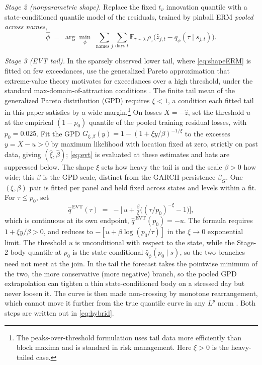 \documentclass[11pt]{article}
\theoremstyle{remark}
\begin{document}
\emph{Stage 2 (nonparametric shape).} Replace the fixed $t_\nu$
innovation quantile with a state-conditioned quantile model of the
residuals, trained by pinball ERM \emph{pooled across names},
\begin{equation}
\widehat{\phi} \;=\; \arg\min_{\phi}\;
\sum_{\text{names } j}\sum_{\text{days } t}
\mathbb{E}_{\tau\sim\lambda}\,
\rho_\tau\!\big(\widehat{z}_{j,t} - q_\phi(\tau \mid s_{j,t})\big).
\label{eq:shapeERM}
\end{equation}

\emph{Stage 3 (EVT tail).} In the sparsely observed lower tail, where
\eqref{eq:shapeERM} is fitted on few exceedances, use the generalized Pareto
approximation that extreme-value theory motivates for exceedances over
a high threshold, under the standard max-domain-of-attraction
conditions \citep{balkema1974, pickands1975, mcneilfrey2000}. The finite tail mean of the generalized Pareto distribution (GPD) requires $\xi<1$, a condition each fitted tail in this paper
satisfies by a wide margin.\footnote{The peaks-over-threshold formulation uses tail data more efficiently than block maxima \citep{embrechts1997} and is standard in risk management. Here $\xi>0$ is the heavy-tailed case.} On losses $X=-\widehat{z}$, set the threshold $u$ at the empirical $(1-p_0)$ quantile of the pooled training residual losses, with $p_0 = 0.025$. Fit the GPD $G_{\xi,\beta}(y) = 1-(1+\xi y/\beta)^{-1/\xi}$ to the excesses $y = X - u > 0$ by maximum likelihood with location fixed at zero, strictly on past data, giving $(\widehat\xi,\widehat\beta)$; \eqref{eq:evt} is evaluated at these estimates and hats are suppressed below. The shape $\xi$ sets how heavy the tail is and the scale $\beta>0$ how wide; this $\beta$ is the GPD scale, distinct from the GARCH persistence $\beta_G$. One $(\xi,\beta)$ pair is fitted per panel and held fixed across states and levels within a fit. For $\tau \le p_0$, set
\begin{equation}
\widehat{q}^{\,\mathrm{EVT}}(\tau)
\;=\; -\Big[\, u + \tfrac{\beta}{\xi}\big( (\tau/p_0)^{-\xi} - 1 \big)
\Big],
\label{eq:evt}
\end{equation}
which is continuous at its own endpoint, $\widehat q^{\,\mathrm{EVT}}(p_0) = -u$. The formula requires $1+\xi y/\beta>0$, and reduces to $-[u+\beta\log(p_0/\tau)]$ in the $\xi\to0$ exponential limit. The threshold $u$ is unconditional with respect to the state, while the Stage-2 body quantile at $p_0$ is the state-conditional $\widehat q_\phi(p_0\mid s)$, so the two branches need not meet at the join. In the tail the forecast takes the pointwise minimum of the two, the more conservative (more negative) branch, so the pooled GPD extrapolation can tighten a thin state-conditioned body on a stressed day but never loosen it. The curve is then made non-crossing by monotone rearrangement, which cannot move it further from the true quantile curve in any $L^p$ norm \citep{cherno2010rearr}. Both steps are written out in \eqref{eq:hybrid}.
\end{document}
